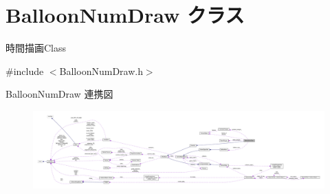 \hypertarget{class_balloon_num_draw}{}\section{Balloon\+Num\+Draw クラス}
\label{class_balloon_num_draw}


時間描画\+Class  




{\ttfamily \#include $<$Balloon\+Num\+Draw.\+h$>$}



Balloon\+Num\+Draw 連携図\nopagebreak
\begin{figure}[H]
\begin{center}
\leavevmode
\includegraphics[width=350pt]{class_balloon_num_draw__coll__graph}
\end{center}
\end{figure}

